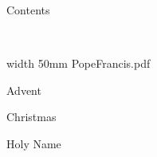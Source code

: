 \eject

\centerline{\bigtype Contents}

\doubleline

\bigskip

\readtocfile

\vfill

\eject

\vfill
\eject


%






\ 

\vfill


\pdfximage width 50mm {PopeFrancis.pdf}

\centerline{\pdfrefximage \pdflastximage}



\vfill



\eject


\beginpart Advent



\paginaproxima


\bigskip


\paginaproxima

\beginpart Christmas


\paginaproxima


\paginaproxima


\paginaproxima

\beginpart Holy Name


